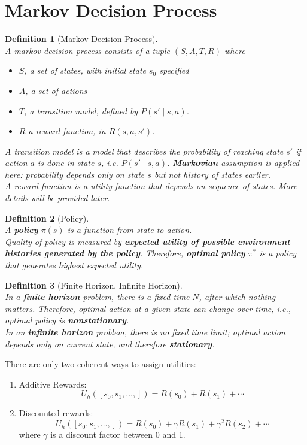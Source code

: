 \documentclass[12pt]{article}
\newtheorem{definition}{Definition}[section]
\theoremstyle{definition}
\begin{document}
\section{Markov Decision Process}
\begin{definition}[Markov Decision Process]
\hfill\\\normalfont A markov decision process consists of a tuple $(S,A,T,R)$ where
\begin{itemize}
\item $S$, a set of states, with initial state $s_0$ specified
\item $A$, a set of actions
\item $T$, a transition model, defined by $P(s'\mid s,a)$.
\item $R$ a reward function, in $R(s,a,s')$.
\end{itemize} 
A transition model is a model that describes the probability of reaching state $s'$ if action $a$ is done in state $s$, i.e. $P(s'\mid s,a)$. \textbf{Markovian} assumption is applied here: probability depends only on state $s$ but not history of states earlier.\\
A reward function is a utility function that depends on \textit{sequence of }states. More details will be provided later.\\
\end{definition}
\begin{definition}[Policy]
\hfill\\\normalfont A \textbf{policy} $\pi(s)$ is a function from state to action.\\
Quality of policy is measured by \textbf{expected utility of possible environment histories generated by the policy}. Therefore, \textbf{optimal policy} $\pi^\ast$ is a policy that generates highest expected utility.
\end{definition}
\begin{definition}[Finite Horizon, Infinite Horizon]
\hfill\\\normalfont In a \textbf{finite horizon} problem, there is a fixed time $N$, after which nothing matters. Therefore, optimal action at a given state can change over time, i.e., optimal policy is \textbf{nonstationary}.\\
In an \textbf{infinite horizon} problem, there is no fixed time limit; optimal action depends only on current state, and therefore \textbf{stationary}.
\end{definition}
There are only two coherent ways to assign utilities: 
\begin{enumerate}
	\item Additive Rewards:
	\[
U_h([s_0,s_1,\ldots, ])=R(s_0)+R(s_1)+\cdots
	\]
	\item Discounted rewards:
	\[
U_h([s_0,s_1,\ldots, ])=R(s_0)+\gamma R(s_1)+\gamma^2 R(s_2)+\cdots
	\]
	where $\gamma$ is a discount factor between 0 and 1.
\end{enumerate}
\end{document}
